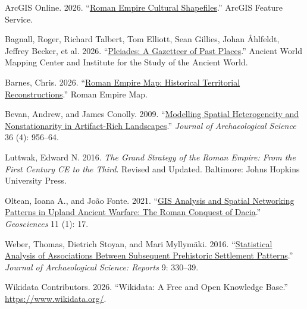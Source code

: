 \documentclass[
  letterpaper,
  DIV=11,
  numbers=noendperiod]{scrartcl}
\newlength{\cslhangindent}
\newenvironment{CSLReferences}[2] %
 {\begin{list}{}{%
  \setlength{\itemindent}{0pt}
  \setlength{\leftmargin}{0pt}
  \setlength{\parsep}{0pt}
  \ifodd #1
   \setlength{\leftmargin}{\cslhangindent}
   \setlength{\itemindent}{-1\cslhangindent}
  \fi
  \setlength{\itemsep}{#2\baselineskip}}}
 {\end{list}}
\begin{document}
\label{refs}
\begin{CSLReferences}{1}{0}
ArcGIS Online. 2026.
{``\href{https://services1.arcgis.com/GWbDzXVIBphv2Dgx/ArcGIS/rest/services/Roman_Empire_Cultural_Shapefiles/FeatureServer}{{Roman
Empire Cultural Shapefiles}}.''} ArcGIS Feature Service.

Bagnall, Roger, Richard Talbert, Tom Elliott, Sean Gillies, Johan
Åhlfeldt, Jeffrey Becker, et al. 2026.
{``\href{https://pleiades.stoa.org/}{{Pleiades}: A Gazetteer of Past
Places}.''} Ancient World Mapping Center and Institute for the Study of
the Ancient World.

Barnes, Chris. 2026. {``\href{https://romanempiremap.com/}{{Roman Empire
Map}: Historical Territorial Reconstructions}.''} Roman Empire Map.

Bevan, Andrew, and James Conolly. 2009.
{``\href{https://doi.org/10.1016/j.jas.2008.11.023}{Modelling Spatial
Heterogeneity and Nonstationarity in Artifact-Rich Landscapes}.''}
\emph{Journal of Archaeological Science} 36 (4): 956--64.

Luttwak, Edward N. 2016. \emph{The Grand Strategy of the Roman Empire:
From the First Century CE to the Third}. Revised and Updated. Baltimore:
Johns Hopkins University Press.

Oltean, Ioana A., and João Fonte. 2021.
{``\href{https://doi.org/10.3390/geosciences11010017}{GIS Analysis and
Spatial Networking Patterns in Upland Ancient Warfare: The Roman
Conquest of Dacia}.''} \emph{Geosciences} 11 (1): 17.

Weber, Thomas, Dietrich Stoyan, and Mari Myllymäki. 2016.
{``\href{https://doi.org/10.1016/j.jasrep.2016.07.022}{Statistical
Analysis of Associations Between Subsequent Prehistoric Settlement
Patterns}.''} \emph{Journal of Archaeological Science: Reports} 9:
330--39.

Wikidata Contributors. 2026. {``{Wikidata}: A Free and Open Knowledge
Base.''} \url{https://www.wikidata.org/}.

\end{CSLReferences}
\end{document}

